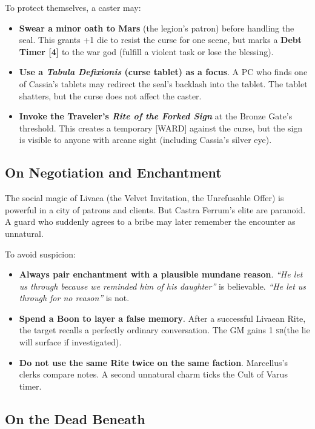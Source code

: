 \documentclass[10pt,twoside]{book}
\newcommand{\tag}[1]{\textsc{[#1]}}
\newcommand{\sb}{\textsc{sb}}
\begin{document}
To protect themselves, a caster may:

\begin{itemize}
\item \textbf{Swear a minor oath to Mars} (the legion's patron) before handling the seal. This grants +1 die to resist the curse for one scene, but marks a \textbf{Debt Timer [4]} to the war god (fulfill a violent task or lose the blessing).
\item \textbf{Use a \textit{Tabula Defixionis} (curse tablet) as a focus}. A PC who finds one of Cassia's tablets may redirect the seal's backlash into the tablet. The tablet shatters, but the curse does not affect the caster.
\item \textbf{Invoke the Traveler's \textit{Rite of the Forked Sign}} at the Bronze Gate's threshold. This creates a temporary \tag{WARD} against the curse, but the sign is visible to anyone with arcane sight (including Cassia's silver eye).
\end{itemize}

\subsection{On Negotiation and Enchantment}

The social magic of Livaea (the Velvet Invitation, the Unrefusable Offer) is powerful in a city of patrons and clients. But Castra Ferrum's elite are paranoid. A guard who suddenly agrees to a bribe may later remember the encounter as unnatural.

To avoid suspicion:

\begin{itemize}
\item \textbf{Always pair enchantment with a plausible mundane reason}. \textit{``He let us through because we reminded him of his daughter''} is believable. \textit{``He let us through for no reason''} is not.
\item \textbf{Spend a Boon to layer a false memory}. After a successful Livaean Rite, the target recalls a perfectly ordinary conversation. The GM gains 1 \sb (the lie will surface if investigated).
\item \textbf{Do not use the same Rite twice on the same faction}. Marcellus's clerks compare notes. A second unnatural charm ticks the Cult of Varus timer.
\end{itemize}

\subsection{On the Dead Beneath}
\end{document}
